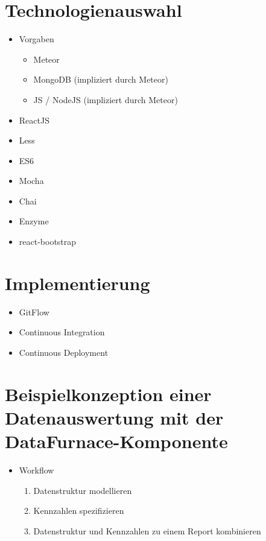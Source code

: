 \documentclass[
  language=german, %
  type=bachelor%
]{isthesis}
\begin{document}
\begin{content}
  \section{Technologienauswahl}
  \begin{itemize}
    \item Vorgaben
      \begin{itemize}
        \item Meteor
        \item MongoDB (impliziert durch Meteor)
        \item JS / NodeJS (impliziert durch Meteor)
      \end{itemize}
    \item ReactJS
    \item Less
    \item ES6
    \item Mocha
    \item Chai
    \item Enzyme
    \item react-bootstrap
  \end{itemize}

  \section{Implementierung}
  \begin{itemize}
    \item GitFlow
    \item Continuous Integration
    \item Continuous Deployment
  \end{itemize}

  \section{Beispielkonzeption einer Datenauswertung mit der DataFurnace-Komponente}
  \begin{itemize}
    \item Workflow
      \begin{enumerate}
        \item Datenstruktur modellieren
        \item Kennzahlen spezifizieren
        \item Datenstruktur und Kennzahlen zu einem Report kombinieren
      \end{enumerate}
  \end{itemize}



\end{content}
\end{document}
